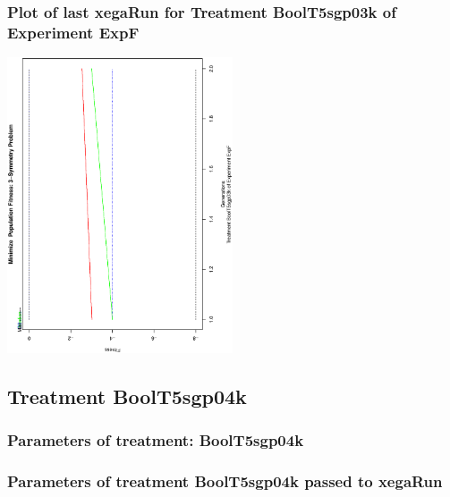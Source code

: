 \documentclass[18pt,c]{beamer}
\makeatletter
\def\beamer@writeslidentry@miniframesoff{%
  \expandafter\beamer@ifempty\expandafter{\beamer@framestartpage}{}%
  {%
   \clearpage\beamer@notesactions%
  }
}
\newcommand*{\miniframesoff}{\let\beamer@writeslidentry=\beamer@writeslidentry@miniframesoff}
\makeatother
\begin{document}
 \begin{frame}
 \frametitle{ Plot of last xegaRun for Treatment BoolT5sgp03k of Experiment ExpF }
 \begin{center}
\includegraphics[width=0.5\textwidth, angle=-90]
{ExpFPlotPopStatsFigure001.eps}
 \end{center}
 \label{report/ExpFPlotPopStatsFigure001.eps}  
 \end{frame}

\miniframesoff
\subsection{Treatment BoolT5sgp04k}

 \begin{frame}
 \fontsize{8pt}{9pt}\selectfont
 \frametitle{  Parameters of treatment: BoolT5sgp04k 
 }

 \label{ExpFtParmTable008.tex}  
 \end{frame}


 \begin{frame}
 \fontsize{8pt}{9pt}\selectfont
 \frametitle{  Parameters of treatment BoolT5sgp04k passed to xegaRun
 }

 \label{ExpFtParmTable009.tex}  
 \end{frame}
\end{document}

